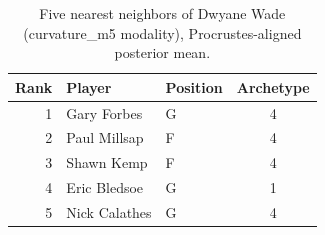 \begin{table}[htbp]
  \centering\small
  \begin{tabular}{rllc}
    \toprule
    Rank & Player & Position & Archetype \\
    \midrule
    1 & Gary Forbes & G & 4 \\
    2 & Paul Millsap & F & 4 \\
    3 & Shawn Kemp & F & 4 \\
    4 & Eric Bledsoe & G & 1 \\
    5 & Nick Calathes & G & 4 \\
    \bottomrule
  \end{tabular}
  \caption{Five nearest neighbors of Dwyane Wade (curvature_m5 modality), Procrustes-aligned posterior mean.}
  \label{tab:Dwyane_Wade_neighbors_curvature_m5}
\end{table}

